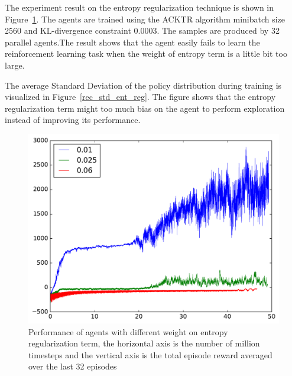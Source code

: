 The experiment result on the entropy regularization technique is shown in Figure~\ref{rec_ent_reg}. The agents are trained using the ACKTR algorithm minibatch size 2560 and KL-divergence constraint 0.0003. The samples are produced by 32 parallel agents.The result shows that the agent easily fails to learn the reinforcement learning task when the weight of entropy term is a little bit too large. 

The average Standard Deviation of the policy distribution during training is visualized in Figure~\ref{rec_std_ent_reg}. The figure shows that the entropy regularization term might too much bias on the agent to perform exploration instead of improving its performance.
\begin{figure}[!htbp]
	\includegraphics[width=\textwidth]{images/rec_ent_reg.pdf}
	\centering
	\caption{Performance of agents with different weight on entropy regularization term, the horizontal axis is the number of million timesteps and the vertical axis is the total episode reward averaged over the last 32 episodes}\label{rec_ent_reg}
\end{figure}

